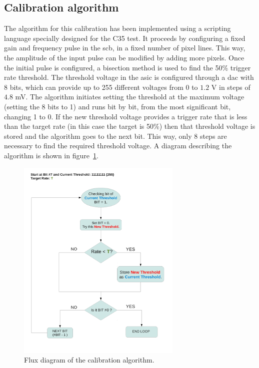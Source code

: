 \documentclass[main.tex]{subfiles}
\begin{document}
\subsection{Calibration algorithm}

The algorithm for this calibration has been implemented using a scripting language specially designed for the C35 test. It proceeds by configuring a fixed gain and frequency pulse in the \gls{scb}, in a fixed number of pixel lines. This way, the amplitude of the input pulse can be modified by adding more pixels. Once the initial pulse is configured, a bisection method is used to find the 50\% trigger rate threshold. The threshold voltage in the \gls{asic} is configured through a \gls{dac} with 8 bits, which can provide up to 255 different voltages from 0 to $1.2$ V in steps of $4.8$ mV. The algorithm initiates setting the threshold at the maximum voltage (setting the 8 bits to 1) and runs bit by bit, from the most significant bit, changing 1 to 0. If the new threshold voltage provides a trigger rate that is less than the target rate (in this case
the target is 50\%) then that threshold voltage is stored and the algorithm goes to the next bit. This way, only 8 steps are necessary to find the required threshold voltage. A diagram describing the algorithm is shown in figure~\ref{fig:calalgorith}.
\begin{figure}[h]
  \centering
  \includegraphics[width=0.7\textwidth]{./Pictures/calibrationalgorithm.pdf}
  \caption{Flux diagram of the calibration algorithm.}
  \label{fig:calalgorith}
\end{figure}
\end{document}
